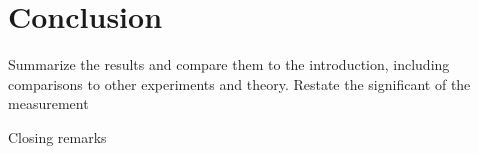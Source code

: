 \section{Conclusion}\label{sec:NuMMConclusion}

Summarize the results and compare them to the introduction, including comparisons to other experiments and theory. Restate the significant of the measurement

Closing remarks